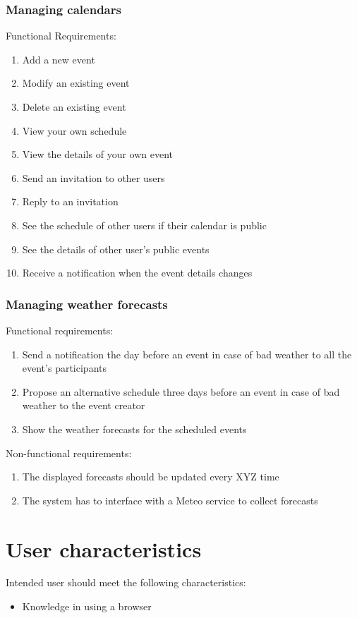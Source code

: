 \documentclass[10pt,a4paper,titlepage]{article}
\begin{document}
\subsubsection{Managing calendars}
Functional Requirements:
\begin{enumerate}[label = FR \arabic*:]
\item Add a new event
\item Modify an existing event
\item Delete an existing event
\item View your own schedule 
\item View the details of your own event
\item Send an invitation to other users
\item Reply to an invitation
\item See the schedule of other users if their calendar is public
\item See the details of other user's public events
\item Receive a notification when the event details changes
\end{enumerate}

\subsubsection{Managing weather forecasts}
Functional requirements:
\begin{enumerate}[label = FR \arabic*:]
\item Send a notification the day before an event in case of bad weather to all the event's participants
\item Propose an alternative schedule three days before an event in case of bad weather to the event creator
\item Show the weather forecasts for the scheduled events 
\end{enumerate}
Non-functional requirements:
\begin{enumerate}[label = NFR \arabic*:]
\item The displayed forecasts should be updated every XYZ time
\item The system has to interface with a Meteo service to collect forecasts
\end{enumerate}

\section{User characteristics}
Intended user should meet the following characteristics:
\begin{itemize}
\item Knowledge in using a browser
\end{itemize}
\end{document}
